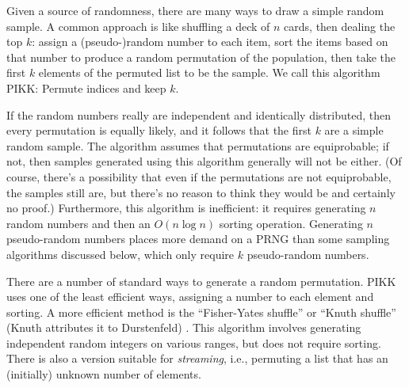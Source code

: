 \documentclass[graybox]{svmult}
\begin{document}
Given a source of randomness, there are many ways to draw a simple random sample.
A common approach is like shuffling a deck of $n$ cards, then dealing the top $k$:
assign a (pseudo-)random number to each item, sort the items based on that number
to produce a random permutation of the population, 
then take the first $k$ elements of the permuted list to be the sample.
We call this algorithm PIKK: Permute indices and keep $k$.

If the random numbers really are independent and identically distributed, then every permutation is equally likely, 
and it follows that the first $k$ are a simple random sample.
The algorithm assumes that permutations are equiprobable; if not, then samples generated using this algorithm generally will not be either. 
(Of course, there's a possibility that even if the permutations are not equiprobable, the samples still
are, but there's no reason to think they would be and certainly no proof.)
Furthermore, this algorithm is inefficient: it requires generating $n$ random numbers and then an $O(n\log n)$ sorting operation.
Generating $n$ pseudo-random numbers places more demand on a PRNG than some sampling algorithms discussed below, which only require $k$ pseudo-random numbers.

%

There are a number of standard ways to generate a random permutation.
PIKK uses one of the least efficient ways, assigning a number to each element and sorting.
A more efficient method is the ``Fisher-Yates shuffle'' or ``Knuth shuffle'' (Knuth attributes it to Durstenfeld) \cite{knuth_art_1997}.
This algorithm involves generating independent random integers on various ranges, but does not require sorting.
There is also a version suitable for \emph{streaming}, i.e., permuting a list that has an (initially) unknown number of elements.
\end{document}
